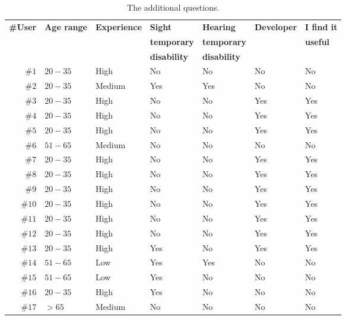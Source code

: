 \begin{table}
  \caption{The additional questions.}
 \label{tbl:additional_questions}
\footnotesize
\centering
 \begin{tabular}{r l l l l l l}
  \hline 
  \textbf{\#User} & \textbf{Age range} 	& \textbf{Experience} & \textbf{Sight} & \textbf{Hearing} & \textbf{Developer} & \textbf{I find it} \\
		  &   			& 		      & \textbf{temporary}       & \textbf{temporary}	&	& \textbf{useful}\\
		  & 			& 		      & \textbf{disability}	 & \textbf{disability} & & \\
  \hline
  $\#1$ & $20-35$ 	     & High		   & No			      & No			   & No			& No	\\
  $\#2$ & $20-35$ 	     & Medium		   & Yes		      & Yes			   & No			& No	\\
  $\#3$ & $20-35$ 	     & High		   & No			      & No			   & Yes		& Yes	\\
  $\#4$ & $20-35$ 	     & High		   & No			      & No			   & Yes		& Yes	\\
  $\#5$ & $20-35$ 	     & High		   & No			      & No			   & Yes		& Yes	\\
  $\#6$ & $51-65$ 	     & Medium		   & No			      & No			   & No			& No	\\
  $\#7$ & $20-35$ 	     & High		   & No			      & No			   & Yes		& Yes	\\
  $\#8$ & $20-35$ 	     & High		   & No			      & No			   & Yes		& Yes	\\
  $\#9$ & $20-35$ 	     & High		   & No			      & No			   & Yes		& Yes	\\
  $\#10$ & $20-35$ 	     & High		   & No			      & No			   & Yes		& Yes	\\
  $\#11$ & $20-35$ 	     & High		   & No			      & No			   & Yes		& Yes	\\
  $\#12$ & $20-35$ 	     & High		   & No			      & No			   & Yes		& Yes	\\
  $\#13$ & $20-35$ 	     & High		   & Yes		      & No			   & Yes		& Yes	\\
  $\#14$ & $51-65$ 	     & Low		   & Yes		      & Yes			   & No			& No	\\
  $\#15$ & $51-65$ 	     & Low		   & Yes		      & No			   & No			& No	\\
  $\#16$ & $20-35$ 	     & High		   & Yes		      & No			   & No			& No	\\
  $\#17$ & $>65$ 	     & Medium		   & No			      & No			   & No			& No	\\

\end{tabular}
\end{table}
